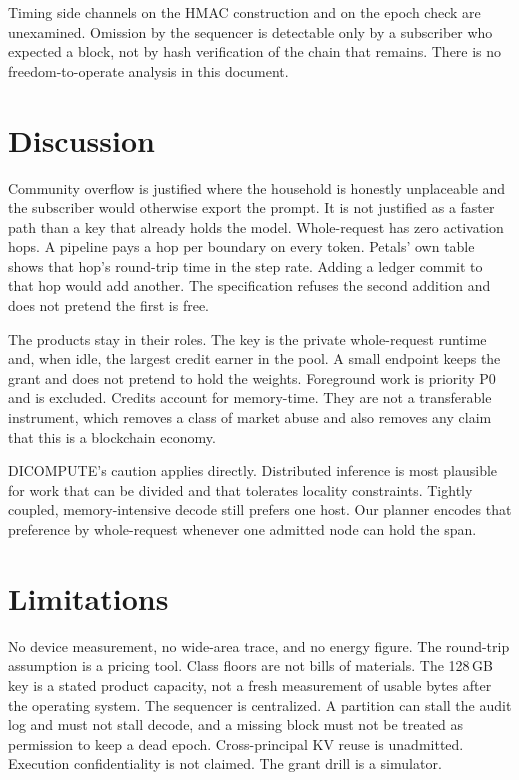 \documentclass[11pt]{article}
\begin{document}
Timing side channels on the HMAC construction and on the epoch check are unexamined. Omission by the sequencer is detectable only by a subscriber who expected a block, not by hash verification of the chain that remains. There is no freedom-to-operate analysis in this document.

\section{Discussion}
Community overflow is justified where the household is honestly unplaceable and the subscriber would otherwise export the prompt. It is not justified as a faster path than a key that already holds the model. Whole-request has zero activation hops. A pipeline pays a hop per boundary on every token. Petals' own table shows that hop's round-trip time in the step rate. Adding a ledger commit to that hop would add another. The specification refuses the second addition and does not pretend the first is free.

The products stay in their roles. The key is the private whole-request runtime and, when idle, the largest credit earner in the pool. A small endpoint keeps the grant and does not pretend to hold the weights. Foreground work is priority P0 and is excluded. Credits account for memory-time. They are not a transferable instrument, which removes a class of market abuse and also removes any claim that this is a blockchain economy.

DICOMPUTE's caution applies directly. Distributed inference is most plausible for work that can be divided and that tolerates locality constraints. Tightly coupled, memory-intensive decode still prefers one host. Our planner encodes that preference by whole-request whenever one admitted node can hold the span.

\section{Limitations}
No device measurement, no wide-area trace, and no energy figure. The round-trip assumption is a pricing tool. Class floors are not bills of materials. The 128\,GB key is a stated product capacity, not a fresh measurement of usable bytes after the operating system. The sequencer is centralized. A partition can stall the audit log and must not stall decode, and a missing block must not be treated as permission to keep a dead epoch. Cross-principal KV reuse is unadmitted. Execution confidentiality is not claimed. The grant drill is a simulator.
\end{document}
